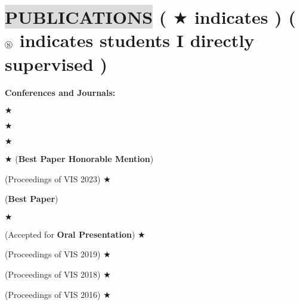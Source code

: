 \section*{
    \colorbox{gainsboro}{PUBLICATIONS}  {\small \normalfont ( \footnotesize $\bigstar$ \small indicates  ) ( $\circledS$ indicates students I directly supervised )}
}
    

\textbf{Conferences and Journals:}
\vspace{-3mm}
\begin{etaremune}[leftmargin=7mm]
    \item {} \footnotesize $\bigstar$ \small
    \item {}
    \item {} \footnotesize $\bigstar$ \small
    \item {} \footnotesize $\bigstar$ \small
    \item {} \footnotesize $\bigstar$ \small (\textbf{Best Paper Honorable Mention})
    \item {} (Proceedings of VIS 2023) \footnotesize $\bigstar$ \small
    \item {}
    \item {}
    \item {} (\textbf{Best Paper})
    \item {}
    \item {} \footnotesize $\bigstar$ \small
    \item {} (Accepted for \textbf{Oral Presentation}) \footnotesize $\bigstar$ \small
    \item {} (Proceedings of VIS 2019) \footnotesize $\bigstar$ \small
    \item {} (Proceedings of VIS 2018) \footnotesize $\bigstar$ \small
    \item {} (Proceedings of VIS 2016) \footnotesize $\bigstar$ \small
    \item {}
\end{etaremune}

